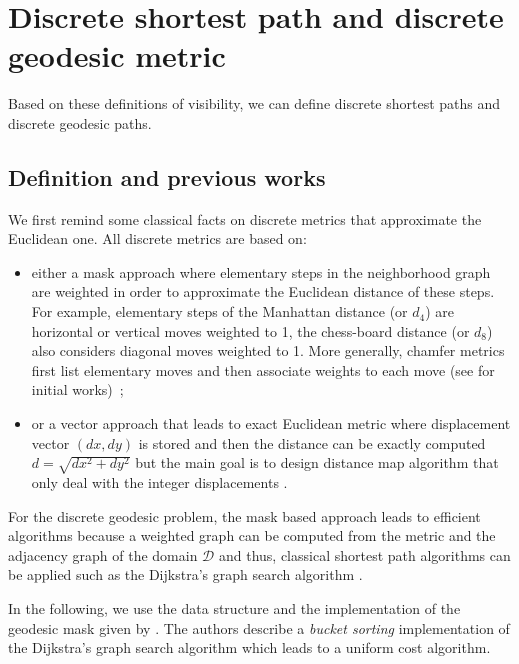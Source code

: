 \documentclass[fleqn,twoside]{article}
\begin{document}
\section{Discrete shortest path and discrete geodesic metric}

Based on these definitions of  visibility, we can define discrete shortest paths and discrete
geodesic paths.

\subsection{Definition and previous works}

We   first  remind  some classical   facts   on discrete metrics  that
approximate the Euclidean one. All discrete metrics are based on:
\begin{itemize}
\item  either    a mask approach     where  elementary steps   in  the
neighborhood graph are weighted in order  to approximate the Euclidean
distance of  these  steps.  For  example,   elementary  steps of   the
Manhattan  distance (or  $d_4$)    are horizontal  or  vertical  moves
weighted to  1, the chess-board   distance (or  $d_8$) also  considers
diagonal moves weighted to 1.   More generally, chamfer metrics  first
list  elementary moves  and then  associate weights to  each move (see
\cite{borgefors,verwer} for initial works)~;
\item or a vector approach that leads to  exact Euclidean metric where
displacement vector $(dx,dy)$  is stored and then  the distance can be
exactly computed $d=\sqrt{dx^2+dy^2}$ but  the main goal is to  design
distance map algorithm  that only deal  with the integer displacements
\cite{danielson,ragnemalm,cuisenaire}.
\end{itemize}


For  the discrete geodesic problem, the   mask based approach leads to
efficient algorithms because a weighted graph can be computed from the
metric and  the adjacency graph of  the domain $\mathcal{D}$ and thus,
classical  shortest   path algorithms   can be  applied   such  as the
Dijkstra's graph search algorithm \cite{piper}.

In the following, we use the  data structure and the implementation of
the geodesic mask given  by \cite{verwer_uniform}. The
authors    describe  a {\it bucket     sorting} implementation of the
Dijkstra's graph   search algorithm  which  leads to   a  uniform cost
algorithm.

\end{document}
